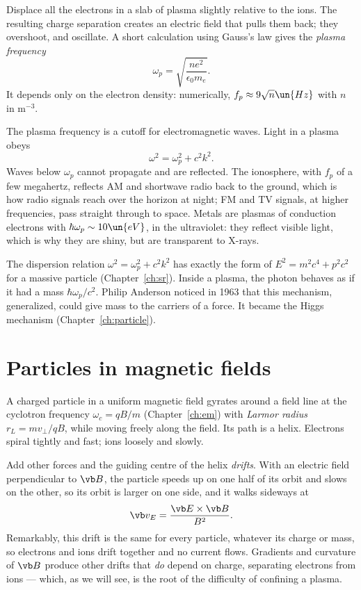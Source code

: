 Displace all the electrons in a slab of plasma slightly relative to the ions. The resulting charge separation creates an electric field that pulls them back; they overshoot, and oscillate. A short calculation using Gauss's law gives the \emph{plasma frequency}
\[
  \omega_p = \sqrt{\frac{ne^2}{\epsilon_0 m_e}} .
\]
It depends only on the electron density: numerically, $f_p\approx9\sqrt{n}\un{Hz}$ with $n$ in $\mathrm{m^{-3}}$.

The plasma frequency is a cutoff for electromagnetic waves. Light in a plasma obeys
\[
  \omega^2 = \omega_p^2 + c^2k^2 .
\]
Waves below $\omega_p$ cannot propagate and are reflected. The ionosphere, with $f_p$ of a few megahertz, reflects AM and shortwave radio back to the ground, which is how radio signals reach over the horizon at night; FM and TV signals, at higher frequencies, pass straight through to space. Metals are plasmas of conduction electrons with $\hbar\omega_p\sim10\un{eV}$, in the ultraviolet: they reflect visible light, which is why they are shiny, but are transparent to X-rays.

\begin{keyidea}
The dispersion relation $\omega^2 = \omega_p^2 + c^2k^2$ has exactly the form of $E^2 = m^2c^4 + p^2c^2$ for a massive particle (Chapter~\ref{ch:sr}). Inside a plasma, the photon behaves as if it had a mass $\hbar\omega_p/c^2$. Philip Anderson noticed in 1963 that this mechanism, generalized, could give mass to the carriers of a force. It became the Higgs mechanism (Chapter~\ref{ch:particle}).
\end{keyidea}

\section{Particles in magnetic fields}

A charged particle in a uniform magnetic field gyrates around a field line at the cyclotron frequency $\omega_c = qB/m$ (Chapter~\ref{ch:em}) with \emph{Larmor radius} $r_L = mv_\perp/qB$, while moving freely along the field. Its path is a helix. Electrons spiral tightly and fast; ions loosely and slowly.

Add other forces and the guiding centre of the helix \emph{drifts}. With an electric field perpendicular to $\vb B$, the particle speeds up on one half of its orbit and slows on the other, so its orbit is larger on one side, and it walks sideways at
\[
  \vb v_E = \frac{\vb E\times\vb B}{B^2}.
\]
Remarkably, this drift is the same for every particle, whatever its charge or mass, so electrons and ions drift together and no current flows. Gradients and curvature of $\vb B$ produce other drifts that \emph{do} depend on charge, separating electrons from ions --- which, as we will see, is the root of the difficulty of confining a plasma.

